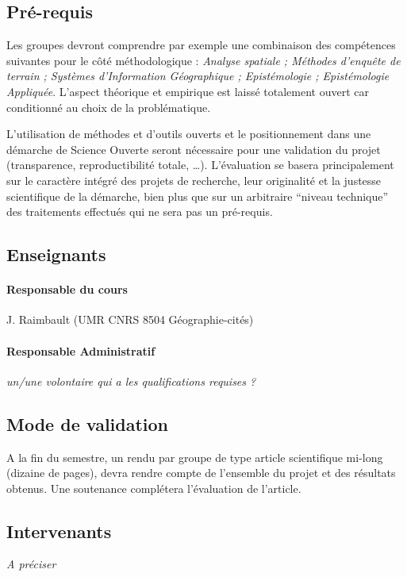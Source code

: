 \documentclass[11pt]{article}
\begin{document}
\subsection*{Pré-requis}

Les groupes devront comprendre par exemple une combinaison des compétences suivantes pour le côté méthodologique :
\textit{Analyse spatiale ; Méthodes d'enquête de terrain ; Systèmes d'Information Géographique ; Epistémologie ; Epistémologie Appliquée}. L'aspect théorique et empirique est laissé totalement ouvert car conditionné au choix de la problématique.

\medskip

L'utilisation de méthodes et d'outils ouverts et le positionnement dans une démarche de Science Ouverte seront nécessaire pour une validation du projet (transparence, reproductibilité totale, \ldots). L'évaluation se basera principalement sur le caractère intégré des projets de recherche, leur originalité et la justesse scientifique de la démarche, bien plus que sur un arbitraire ``niveau technique'' des traitements effectués qui ne sera pas un pré-requis.

\subsection*{Enseignants}

\paragraph{Responsable du cours} J. Raimbault (UMR CNRS 8504 Géographie-cités)

\paragraph{Responsable Administratif} \textit{un/une volontaire qui a les qualifications requises ?}

\subsection*{Mode de validation}

A la fin du semestre, un rendu par groupe de type article scientifique mi-long (dizaine de pages), devra rendre compte de l'ensemble du projet et des résultats obtenus. Une soutenance complétera l'évaluation de l'article.



\renewcommand{\bibsection}{\subsection*{Lectures proposées}}






\subsection*{Intervenants}

\textit{A préciser}
\end{document}
